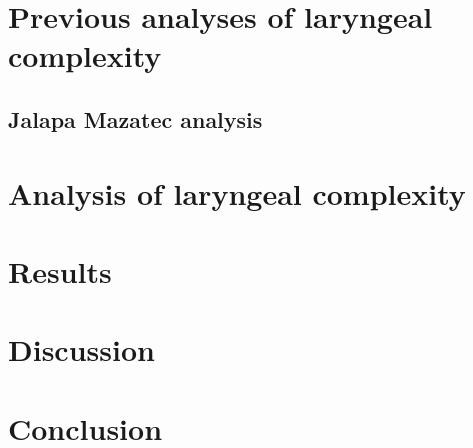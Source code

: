 \section{Previous analyses of laryngeal complexity}\label{sec:previous_analyses}

\subsection{Jalapa Mazatec analysis}\label{sec:jalapa_mazatec_analysis}




\section{Analysis of laryngeal complexity}\label{sec:analysis_of_lc}


\section{Results}\label{sec:results_of_lc}


\section{Discussion}\label{sec:discussion_of_lc}

\citet{humbertConsonantTypesVowel1978} 


\section{Conclusion}\label{sec:conclusion_of_lc}
